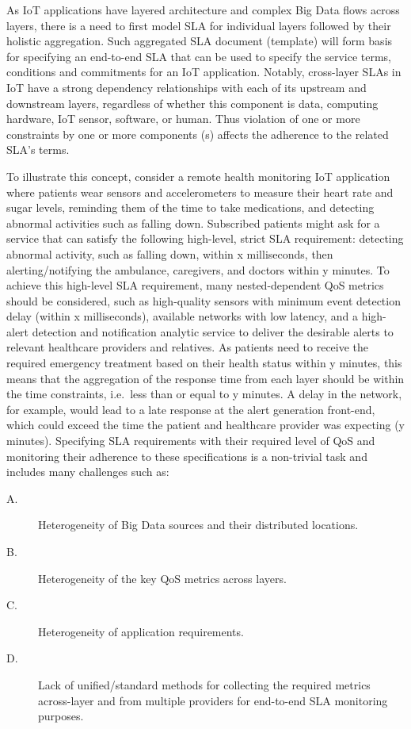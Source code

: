 As IoT applications have layered architecture and complex Big Data flows across layers, there is a need to first model SLA for individual layers followed by their holistic aggregation.
Such aggregated SLA document (template) will form basis for specifying an end-to-end SLA that can be used to specify the service terms,
conditions and commitments for an IoT application. Notably, cross-layer SLAs in IoT have a strong dependency relationships with each of its upstream and downstream layers,
regardless of whether this component is data, computing hardware, IoT sensor, software, or human.
Thus violation of one or more constraints by one or more components (s) affects the adherence to the related SLA's terms. 

To illustrate this concept, consider a remote health monitoring IoT application \cite{ref13} where patients wear sensors and accelerometers to measure their heart rate and sugar levels, reminding them of the time to take medications, and detecting abnormal activities such as falling down.
Subscribed patients might ask for a service that can satisfy the following high-level, strict SLA requirement: detecting abnormal activity, such as falling down, within x milliseconds, then alerting/notifying the ambulance, caregivers, and doctors within y minutes.
To achieve this high-level SLA requirement, many nested-dependent QoS metrics should be considered, such as high-quality sensors with minimum event detection delay (within x milliseconds), available networks with low latency, and a high-alert detection and notification analytic service to deliver the desirable alerts to relevant healthcare providers and relatives.
As patients need to receive the required emergency treatment based on their health status within y minutes, this means that the aggregation of the response time from each layer should be within the time constraints, i.e.~less than or equal to y minutes.
A delay in the network, for example, would lead to a late response at the alert generation front-end, which could exceed the time the patient and healthcare provider was expecting (y minutes).
Specifying SLA requirements with their required level of QoS and monitoring their adherence to these specifications is a non-trivial task and includes many challenges such as:
\begin{description}
  \item[A.] Heterogeneity of Big Data sources and their distributed locations.
  \item[B.] Heterogeneity of the key QoS metrics across layers.
  \item[C.] Heterogeneity of application requirements.
  \item[D.] Lack of unified/standard methods for collecting the required metrics across-layer and from multiple providers for end-to-end SLA monitoring purposes.
\end{description}

